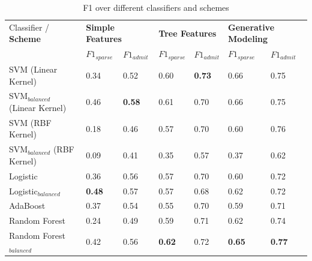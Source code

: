 \documentclass{sig-alternate-05-2015}
\begin{document}
\begin{table}[t]
\centering
\caption{F1 over different classifiers and schemes}
\label{tab:all-f1}
\begin{tabular}{|l|l l|l l|l l|}
\hline
Classifier / \textbf{Scheme} & \multicolumn{2}{l|}{\textbf{Simple Features}} & \multicolumn{2}{l|}{\textbf{Tree Features}} & \multicolumn{2}{l|}{\textbf{Generative Modeling}} \\
 & $F1_{sparse}$ & $F1_{admit}$ & $F1_{sparse}$ & $F1_{admit}$ & $F1_{sparse}$ & $F1_{admit}$ \\ \hline
SVM (Linear Kernel) 				& 0.34 & 0.52 & 0.60 & \textbf{0.73} & 0.66 & 0.75 \\ \hline
SVM$_{balanced}$ (Linear Kernel)	& 0.46 & \textbf{0.58} & 0.61 & 0.70 & 0.66 & 0.75 \\ \hline
SVM (RBF Kernel) 					& 0.18 & 0.46 & 0.57 & 0.70 & 0.60 & 0.76 \\ \hline
SVM$_{balanced}$ (RBF Kernel) 		& 0.09 & 0.41 & 0.35 & 0.57 & 0.37 & 0.62 \\ \hline
Logistic 							& 0.36 & 0.56 & 0.57 & 0.70 & 0.60 & 0.72 \\ \hline
Logistic$_{balanced}$ 				& \textbf{0.48} & 0.57 & 0.57 & 0.68 & 0.62 & 0.72 \\ \hline
AdaBoost 							& 0.37 & 0.54 & 0.55 & 0.70 & 0.59 & 0.71 \\ \hline
Random Forest 						& 0.24 & 0.49 & 0.59 & 0.71 & 0.62 & 0.74 \\ \hline
Random Forest$_{balanced}$ 			& 0.42 & 0.56 & \textbf{0.62} & 0.72 & \textbf{0.65} & \textbf{0.77} \\ \hline
\end{tabular}
\end{table}
\end{document}
